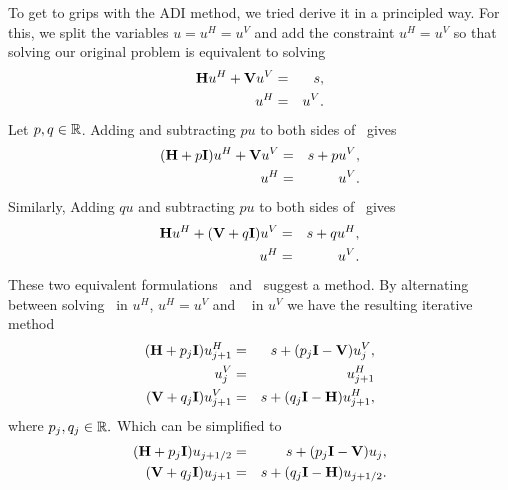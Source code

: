 \documentclass[10pt]{article}
\makeatletter
\renewcommand*{\eqref}[1]{%
  \hyperref[{#1}]{\textup{\tagform@{\ref*{#1}}}}%
}
\theoremstyle{definition}
\makeatother
\begin{document}
To get to grips with the ADI method, we tried derive it in a principled way. For this, we split the variables $u = u^H = u^V$ and add the constraint $u^H =u^V$ so that solving our original problem is equivalent to solving
\begin{eqnarray}
 {\bf H} u^H + {\bf V} u^V &=& s, \label{eq:a83j8ja3} \\
 u^H & =& u^V. \nonumber
\end{eqnarray}
Let $p,q \in \mathbb{R}$. Adding and subtracting $p u$ to both sides of~\eqref{eq:a83j8ja3} gives
\begin{eqnarray}
 ({\bf H}+p{\bf I}) u^H + {\bf V} u^V &=& s+p u^V,  \label{eq:sysinuH}\\
 u^H & =& u^V. \nonumber
\end{eqnarray}
Similarly,  Adding $q u$ and subtracting $p u$ to both sides of~\eqref{eq:a83j8ja3} gives
\begin{eqnarray}
 {\bf H} u^H + ({\bf V}+ q {\bf I} )u^V &=& s+q u^H, \label{eq:sysinuV}\\
 u^H & =& u^V. \nonumber
\end{eqnarray}
These two equivalent formulations~\eqref{eq:sysinuH} and~\eqref{eq:sysinuV} suggest a method. By alternating between solving~\eqref{eq:sysinuH} in $u^H$, $u^H =u^V$ and
 ~\eqref{eq:sysinuV} in $u^V$ we have the resulting iterative method
 \begin{eqnarray}
 ({\bf H}+p_j{\bf I}) u^H_{j+1} &=& s+(p_j{\bf I}-{\bf V}) u^V_j,   \nonumber  \\
 u^V_j & =& u_{j+1}^H  \nonumber \\
 ({\bf V}+ q_j {\bf I} )u^V_{j+1} &=& s+(q_j {\bf I} -{\bf H}) u^H_{j+1}, \label{eq:sysinuH_contrain_syinuV}
\end{eqnarray}
where $p_j, q_j \in \mathbb{R}.$
 Which can be simplified to
  \begin{eqnarray}
 ({\bf H}+p_j {\bf I}) u_{j+1/2} &=& s+(p_j{\bf I}-{\bf V}) u_j,   \label{eq:ujplushalf}  \\
 ({\bf V}+ q_j {\bf I} )u_{j+1} &=& s+(q_j {\bf I} -{\bf H}) u_{j+1/2}.\label{eq:ujplus1}
\end{eqnarray}
%
\end{document}
